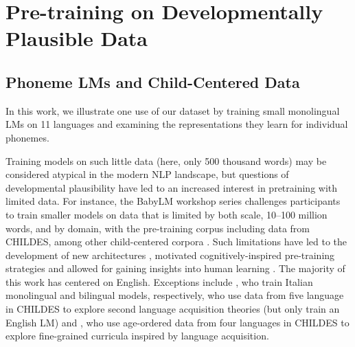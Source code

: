 

\section{Pre-training on Developmentally Plausible Data}\label{sec:12-babylm}

\subsection{Phoneme LMs and Child-Centered Data}\label{sec:13-babylm}


In this work, we illustrate one use of our dataset by training small monolingual LMs on 11 languages and examining the representations they learn for individual phonemes. 

Training models on such little data (here, only 500 thousand words) may be considered atypical in the modern NLP landscape, but questions of developmental plausibility have led to an increased interest in pretraining with limited data. For instance, the BabyLM workshop series challenges participants to train smaller models on data that is limited by both scale, 10--100 million words, and by domain, with the pre-training corpus including data from CHILDES, among other child-centered corpora \citep{warstadt-2023-babylm-findings, hu-etal-2024-findings}. Such limitations have led to the development of new architectures \citep{georges-gabriel-charpentier-samuel-2023-layers, charpentier2024gpt}, motivated cognitively-inspired pre-training strategies \citep{huebner-etal-2021-babyberta, martinez-etal-2023-climb} and allowed for gaining insights into human learning \citep{yedetore-etal-2023-poor}. The majority of this work has centered on English. Exceptions include \citet{capone2024babies, shen2024bambino}, who train Italian monolingual and bilingual models, respectively, \citet{yadavalli2023slabert} who use data from five language in CHILDES to explore second language acquisition theories (but only train an English LM) and \citet{salhan-etal-2024-less}, who use age-ordered data from four languages in CHILDES to explore fine-grained curricula inspired by language acquisition.

